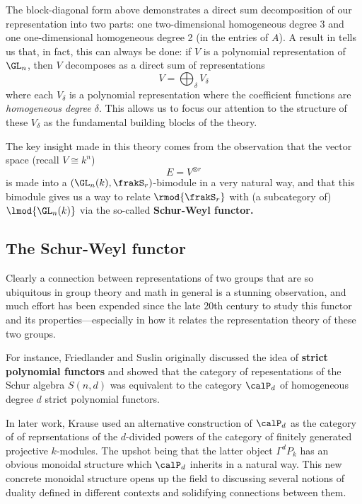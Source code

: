\documentclass[12pt]{article}
\begin{document}
The block-diagonal form above demonstrates a direct sum decomposition of our representation into two parts: one two-dimensional homogeneous degree 3
and one one-dimensional homogeneous degree 2 (in the entries of $A$). A result in \cite{schur-thesis} tells us that, in fact, this can always be done: 
if $V$ is a polynomial representation of $\GL_n$,
then $V$ decomposes as a direct sum of representations 
\[V=\bigoplus_\delta V_\delta\]
where each $V_\delta$ is a polynomial representation where the coefficient functions are \textit{homogeneous degree $\delta$}. 
This allows us to focus our attention to the structure of these $V_\delta$ as the fundamental building blocks of the theory.

The key insight made in this theory comes from the observation that the vector space (recall $V\cong k^n$)
\[E=V^{\otimes r}\]
is made into a $(\GL_n(k),\frakS_r)$-bimodule in a very natural way, and that this bimodule gives us a way to relate 
$\rmod {\frakS_r}$ with (a subcategory of) $\lmod {\GL_n(k)}$ via the so-called \textbf{Schur-Weyl functor.}

\subsection{The Schur-Weyl functor}
Clearly a connection between representations of two groups that are so ubiquitous in group theory and math in general 
is a stunning observation, and much effort has been expended since the late 20th century to study this functor and its 
properties---especially in how it relates the representation theory of these two groups. 

For instance, Friedlander and Suslin \cite{friedlander-suslin}
originally discussed the idea of \textbf{strict polynomial functors} and showed that the category of repesentations 
of the Schur algebra $S(n,d)$ was equivalent to the category $\calP_d$ of homogeneous degree $d$ strict polynomial functors.

In later work, Krause \cite{krause-strict-poly-func} used an alternative construction of $\calP_d$ as the category of
of reprsentations of the $d$-divided powers of the category of finitely generated projective $k$-modules. The upshot being that 
the latter object $\Gamma^d P_k$ has an obvious monoidal structure which $\calP_d$ inherits in a natural way. This new concrete 
monoidal structure opens up the field to discussing several notions of duality defined in different contexts 
and solidifying connections between them.
\end{document}
